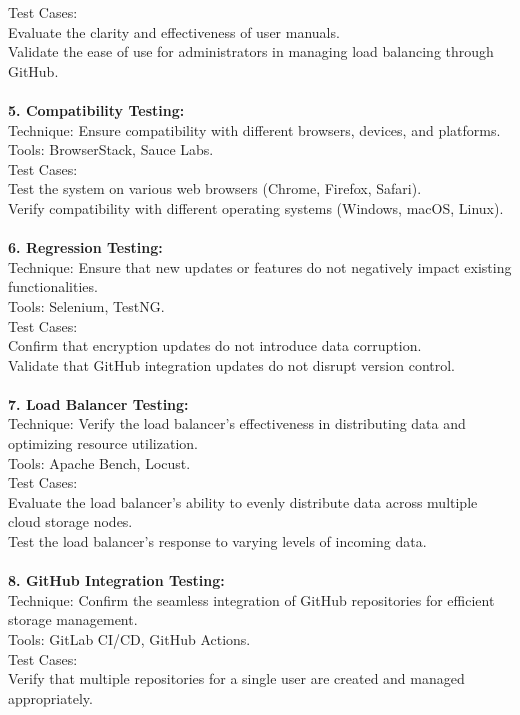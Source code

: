 Test Cases:\\
Evaluate the clarity and effectiveness of user manuals.\\
Validate the ease of use for administrators in managing load balancing through GitHub.
\\
\\
\textbf{5. Compatibility Testing:}\\
Technique: Ensure compatibility with different browsers, devices, and platforms.\\
Tools: BrowserStack, Sauce Labs.\\
Test Cases:\\
Test the system on various web browsers (Chrome, Firefox, Safari).\\
Verify compatibility with different operating systems (Windows, macOS, Linux). 
\\
\\
\textbf{6. Regression Testing: }\\
Technique: Ensure that new updates or features do not negatively impact existing functionalities.\\
Tools: Selenium, TestNG.\\
Test Cases:\\
Confirm that encryption updates do not introduce data corruption.\\
Validate that GitHub integration updates do not disrupt version control. 
\\
\\
\textbf{7. Load Balancer Testing:}\\
Technique: Verify the load balancer's effectiveness in distributing data and optimizing resource
utilization.\\
Tools: Apache Bench, Locust.\\
Test Cases:\\
Evaluate the load balancer's ability to evenly distribute data across multiple cloud storage nodes.\\
Test the load balancer's response to varying levels of incoming data. 
\\
\\
\textbf{8. GitHub Integration Testing:}\\
Technique: Confirm the seamless integration of GitHub repositories for efficient storage
management.\\
Tools: GitLab CI/CD, GitHub Actions.\\
Test Cases:\\
Verify that multiple repositories for a single user are created and managed appropriately.\\

